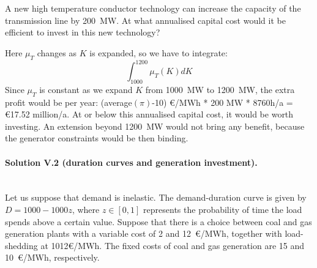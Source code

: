 \documentclass[11pt,a4paper,fleqn]{scrartcl}
\def\m{\mu}
\begin{document}
\begin{enumerate}[(a)]
 \begin{shaded}\item A new high temperature conductor technology can increase the capacity of the transmission line by 200~MW. At what annualised capital cost would it be efficient to invest in this new technology?\end{shaded}

 Here $\m_T$ changes as $K$ is expanded, so we have to integrate:
 \begin{equation*}
  \int_{1000}^{1200} \m_T(K) dK
 \end{equation*}
 Since  $\m_T$ is constant as we expand $K$ from 1000~MW to 1200~MW, the extra profit would be per year: (average$(\pi)$-10) \euro/MWh * 200 MW * 8760h/a = \euro 17.52 million/a.
 At or below this annualised capital cost, it would be worth investing. An extension beyond 1200~MW would not bring any benefit, because the generator constraints would be then binding.
\end{enumerate}
\paragraph{Solution V.2 \normalsize (duration curves and generation investment).}~\\

Let us suppose that demand is inelastic. The demand-duration curve is given by $D=1000-1000z$, where $z\in[0,1]$ represents the probability of time the load spends above a certain value. Suppose that there is a choice between coal and gas generation plants with a variable cost of 2 and 12~\euro/MWh, together with load-shedding at 1012\euro/MWh. The fixed costs of coal and gas generation are 15 and 10~\euro/MWh, respectively.
\end{document}
